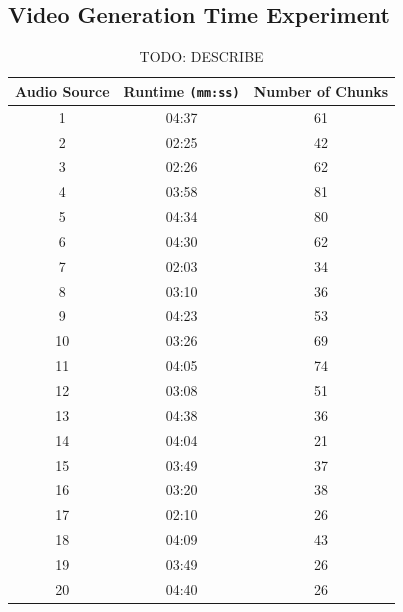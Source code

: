 \documentclass{l4proj}
\begin{document}
\begin{appendices}
\chapter{Video Generation Time Experiment}
\begin{table}
    \centering
    \begin{tabular}{|c|c|c|}
        \hline
        \textbf{Audio Source} & \textbf{Runtime \lstinline|(mm:ss)|} & \textbf{Number of Chunks} \\
        \hline
        \hline
        1 & 04:37 & 61 \\
        \hline
        2 & 02:25 & 42 \\
        \hline
        3 & 02:26 & 62 \\
        \hline
        4 & 03:58 & 81 \\
        \hline
        5 & 04:34 & 80 \\
        \hline
        6 & 04:30 & 62 \\
        \hline
        7 & 02:03 & 34 \\
        \hline
        8 & 03:10 & 36 \\
        \hline
        9 & 04:23 & 53 \\
        \hline
        10 & 03:26 & 69 \\
        \hline
        11 & 04:05 & 74 \\
        \hline
        12 & 03:08 & 51 \\
        \hline
        13 & 04:38 & 36 \\
        \hline
        14 & 04:04 & 21 \\
        \hline
        15 & 03:49 & 37 \\
        \hline
        16 & 03:20 & 38 \\
        \hline
        17 & 02:10 & 26 \\
        \hline
        18 & 04:09 & 43 \\
        \hline
        19 & 03:49 & 26 \\
        \hline
        20 & 04:40 & 26 \\
        \hline
    \end{tabular}
    \caption{TODO: DESCRIBE}\label{tab:audio_sources}
\end{table}


\end{appendices}
\end{document}
